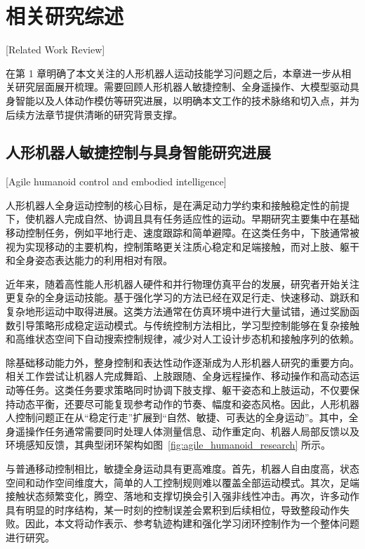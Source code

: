 
\chapter{相关研究综述}[Related Work Review]

在第 1 章明确了本文关注的人形机器人运动技能学习问题之后，本章进一步从相关研究层面展开梳理。需要回顾人形机器人敏捷控制、全身遥操作、大模型驱动具身智能以及人体动作模仿等研究进展，以明确本文工作的技术脉络和切入点，并为后续方法章节提供清晰的研究背景支撑。

\section{人形机器人敏捷控制与具身智能研究进展}[Agile humanoid control and embodied intelligence]

人形机器人全身运动控制的核心目标，是在满足动力学约束和接触稳定性的前提下，使机器人完成自然、协调且具有任务适应性的运动。早期研究主要集中在基础移动控制任务，例如平地行走、速度跟踪和简单避障。在这类任务中，下肢通常被视为实现移动的主要机构，控制策略更关注质心稳定和足端接触，而对上肢、躯干和全身姿态表达能力的利用相对有限。

近年来，随着高性能人形机器人硬件和并行物理仿真平台的发展，研究者开始关注更复杂的全身运动技能。基于强化学习的方法已经在双足行走、快速移动、跳跃和复杂地形运动中取得进展\cite{xie2020learning,li2023robust,radosavovic2024real,li2024reinforcement,radosavovic2402humanoid,zhuang2024humanoid,gu2024advancing,long2024learning}。这类方法通常在仿真环境中进行大量试错，通过奖励函数引导策略形成稳定运动模式。与传统控制方法相比，学习型控制能够在复杂接触和高维状态空间下自动搜索控制规律，减少对人工设计步态机和接触序列的依赖。

除基础移动能力外，整身控制和表达性动作逐渐成为人形机器人研究的重要方向。相关工作尝试让机器人完成舞蹈、上肢跟随、全身远程操作、移动操作和高动态运动等任务\cite{cheng2024expressive,he2024learning,he2024omnih2o,zhang2024wococo,fu2024humanplus,ji2024exbody2}。这类任务要求策略同时协调下肢支撑、躯干姿态和上肢运动，不仅要保持动态平衡，还要尽可能复现参考动作的节奏、幅度和姿态风格。因此，人形机器人控制问题正在从“稳定行走”扩展到“自然、敏捷、可表达的全身运动”。其中，全身遥操作任务通常需要同时处理人体测量信息、动作重定向、机器人局部反馈以及环境感知反馈，其典型闭环架构如图~\ref{fig:agile_humanoid_research} 所示。

与普通移动控制相比，敏捷全身运动具有更高难度。首先，机器人自由度高，状态空间和动作空间维度大，简单的人工控制规则难以覆盖全部运动模式。其次，足端接触状态频繁变化，腾空、落地和支撑切换会引入强非线性冲击。再次，许多动作具有明显的时序结构，某一时刻的控制误差会累积到后续相位，导致整段动作失败。因此，本文将动作表示、参考轨迹构建和强化学习闭环控制作为一个整体问题进行研究。

